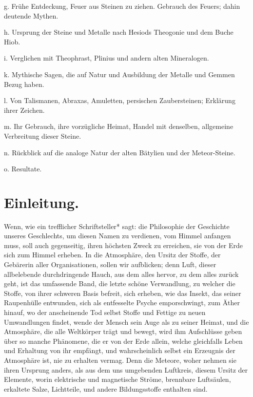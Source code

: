 \documentclass[a4paper, 11pt, oneside, polutonikogreek, german]{article}
\begin{document}
g. Frühe Entdeckung, Feuer aus Steinen zu ziehen. Gebrauch des Feuers; dahin deutende Mythen.

h. Ursprung der Steine und Metalle nach Hesiods Theogonie und dem Buche Hiob.

i. Verglichen mit Theophrast, Plinius und andern alten Mineralogen.

k. Mythische Sagen, die auf Natur und Ausbildung der Metalle und Gemmen Bezug haben.

l. Von Talismanen, Abraxas, Amuletten, persischen Zaubersteinen; Erklärung ihrer Zeichen.

m. Ihr Gebrauch, ihre vorzügliche Heimat, Handel mit denselben, allgemeine Verbreitung dieser Steine.

n. Rückblick auf die analoge Natur der alten Bätylien und der Meteor-Steine.

o. Resultate.
\clearpage
\section*{Einleitung.}
\paragraph{}
Wenn, wie ein trefflicher Schriftsteller* sagt: die Philosophie der Geschichte unseres Geschlechts, um diesen Namen zu verdienen, vom Himmel anfangen muss, soll auch gegenseitig, ihren höchsten Zweck zu erreichen, sie von der Erde sich zum Himmel erheben. In die Atmosphäre, den Ursitz der Stoffe, der Gebärerin aller Organisationen, sollen wir aufblicken; denn Luft, dieser allbelebende durchdringende Hauch, aus dem alles hervor, zu dem alles zurück geht, ist das umfassende Band, die letzte schöne Verwandlung, zu welcher die Stoffe, von ihrer schweren Basis befreit, sich erheben, wie das Insekt, das seiner Raupenhülle entwunden, sich als entfesselte Psyche emporschwingt, zum Äther hinauf, wo der anscheinende Tod selbst Stoffe und Fettige zu neuen Umwandlungen findet, wende der Mensch sein Auge als zu seiner Heimat, und die Atmosphäre, die alle Weltkörper trägt und bewegt, wird ihm Aufschlüsse geben über so manche Phänomene, die er von der Erde allein, welche gleichfalls Leben und Erhaltung von ihr empfängt, und wahrscheinlich selbst ein Erzeugnis der Atmosphäre ist, nie zu erhalten vermag. Denn die Meteore, woher nehmen sie ihren Ursprung anders, als aus dem uns umgebenden Luftkreis, diesem Ursitz der Elemente, worin elektrische und magnetische Ströme, brennbare Luftsäulen, erkaltete Salze, Lichtteile, und andere Bildungsstoffe enthalten sind.
\end{document}
